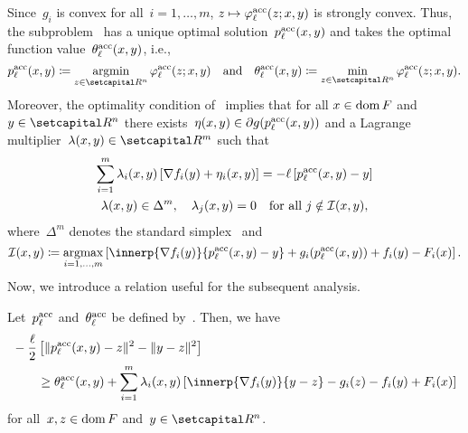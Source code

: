 \documentclass[../main]{subfiles}
\begin{document}
Since~$g_i$ is convex for all~$i = 1, \dots, m$, $z \mapsto \varphi^{\mathrm{acc}}_\ell(z; x, y)$ is strongly convex.
Thus, the subproblem~ has a unique optimal solution~$p^{\mathrm{acc}}_\ell(x, y)$ and takes the optimal function value~$\theta^{\mathrm{acc}}_\ell(x, y)$, i.e.,
\begin{equation} \label{eq:p theta acc}
    p^\acc_\ell(x, y) \coloneqq \argmin_{z \in \setR^n} \varphi^\acc_\ell(z; x, y) \eqand \theta^\acc_\ell(x, y) \coloneqq \min_{z \in \setR^n} \varphi^\acc_\ell(z; x, y)
.\end{equation}
Moreover, the optimality condition of~ implies that for all $x \in \operatorname{dom} F$ and~$y \in \setR^n$ there exists~$\eta(x, y) \in \partial g(p^{\mathrm{acc}}_\ell(x, y))$ and a Lagrange multiplier~$\lambda(x, y) \in \setR^m$ such that
\begin{subequations} \label{eq:kkt}
    \begin{gather} 
        \sum_{i = 1}^m \lambda_i(x, y) \left[ \nabla f_i(y) + \eta_i(x, y) \right] = - \ell \left[ p^{\mathrm{acc}}_\ell(x, y) - y \right] \label{eq:optimal} \\
        \lambda(x, y) \in \Delta^m, \quad \lambda_j(x, y) = 0 \quad \text{for all~$j \notin \mathcal{I}(x, y)$} \label{eq:lambda}
    ,\end{gather}
\end{subequations}
where~$\Delta^m$ denotes the standard simplex~ and
\begin{equation} \label{eq:I}
    \mathcal{I}(x, y) \coloneqq \argmax_{i = 1, \dots, m} \left[ \innerp{\nabla f_i(y)}{p^\acc_\ell(x, y) - y} + g_i(p^\acc_\ell(x, y)) + f_i(y) - F_i(x) \right]
.\end{equation}
Now, we introduce a relation useful for the subsequent analysis.
\begin{lemma} 
    Let~$p^{\mathrm{acc}}_\ell$ and~$\theta^{\mathrm{acc}}_\ell$ be defined by~.
    Then, we have
    \begin{align}
        \MoveEqLeft - \frac{\ell}{2} \left[ \norm{p^\acc_\ell(x, y) - z}^2 - \norm{y - z}^2 \right] \\
        &\ge \theta^\acc_\ell(x, y) + \sum_{i = 1}^{m} \lambda_i(x, y) \left[ \innerp{\nabla f_i(y)}{y - z} - g_i(z) - f_i(y) + F_i(x) \right] 
    \end{align}
    for all~$x, z \in \operatorname{dom} F$ and~$y \in \setR^n$.
\end{lemma}
\end{document}

